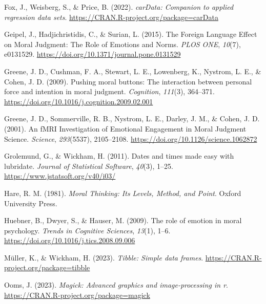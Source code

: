 \documentclass[
  man,floatsintext]{apa7}
\newlength{\cslhangindent}
\newlength{\cslentryspacingunit} %
\newenvironment{CSLReferences}[2] %
 {%
  \setlength{\parindent}{0pt}
  \ifodd #1
  \let\oldpar\par
  \def\par{\hangindent=\cslhangindent\oldpar}
  \fi
  \setlength{\parskip}{#2\cslentryspacingunit}
 }%
 {}
\begin{document}
\begin{CSLReferences}{1}{0}
\leavevmode{}%
Fox, J., Weisberg, S., \& Price, B. (2022). \emph{carData: Companion to applied regression data sets}. \url{https://CRAN.R-project.org/package=carData}

\leavevmode{}%
Geipel, J., Hadjichristidis, C., \& Surian, L. (2015). The {Foreign Language Effect} on {Moral Judgment}: {The Role} of {Emotions} and {Norms}. \emph{PLOS ONE}, \emph{10}(7), e0131529. \url{https://doi.org/10.1371/journal.pone.0131529}

\leavevmode{}%
Greene, J. D., Cushman, F. A., Stewart, L. E., Lowenberg, K., Nystrom, L. E., \& Cohen, J. D. (2009). Pushing moral buttons: {The} interaction between personal force and intention in moral judgment. \emph{Cognition}, \emph{111}(3), 364--371. \url{https://doi.org/10.1016/j.cognition.2009.02.001}

\leavevmode{}%
Greene, J. D., Sommerville, R. B., Nystrom, L. E., Darley, J. M., \& Cohen, J. D. (2001). An {fMRI Investigation} of {Emotional Engagement} in {Moral Judgment} {\textbar} {Science}. \emph{Science}, \emph{293}(5537), 2105--2108. \url{https://doi.org/10.1126/science.1062872}

\leavevmode{}%
Grolemund, G., \& Wickham, H. (2011). Dates and times made easy with {lubridate}. \emph{Journal of Statistical Software}, \emph{40}(3), 1--25. \url{https://www.jstatsoft.org/v40/i03/}

\leavevmode{}%
Hare, R. M. (1981). \emph{Moral {Thinking}: {Its Levels}, {Method}, and {Point}}. {Oxford University Press}.

\leavevmode{}%
Huebner, B., Dwyer, S., \& Hauser, M. (2009). The role of emotion in moral psychology. \emph{Trends in Cognitive Sciences}, \emph{13}(1), 1--6. \url{https://doi.org/10.1016/j.tics.2008.09.006}

\leavevmode{}%
Müller, K., \& Wickham, H. (2023). \emph{Tibble: Simple data frames}. \url{https://CRAN.R-project.org/package=tibble}

\leavevmode{}%
Ooms, J. (2023). \emph{Magick: Advanced graphics and image-processing in r}. \url{https://CRAN.R-project.org/package=magick}


\end{CSLReferences}
\end{document}

